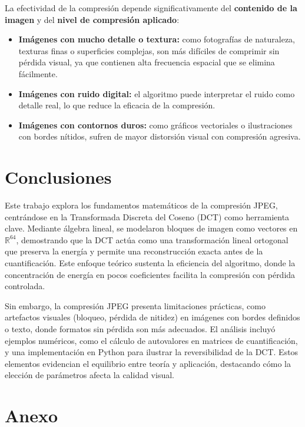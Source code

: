 \documentclass[8pt,a4paper]{article}
\theoremstyle{definition}
\theoremstyle{remark}
\begin{document}
\begin{multicols}{2}
        La efectividad de la compresión depende significativamente del \textbf{contenido de la imagen} y del \textbf{nivel de compresión aplicado}:
            
        \begin{itemize}
        \item \textbf{Imágenes con mucho detalle o textura:} como fotografías de naturaleza, texturas finas o superficies complejas, son más difíciles de comprimir sin pérdida visual, ya que contienen alta frecuencia espacial que se elimina fácilmente.
                
        \item \textbf{Imágenes con ruido digital:} el algoritmo puede interpretar el ruido como detalle real, lo que reduce la eficacia de la compresión.
                
        \item \textbf{Imágenes con contornos duros:} como gráficos vectoriales o ilustraciones con bordes nítidos, sufren de mayor distorsión visual con compresión agresiva.
        \end{itemize}

    \section{Conclusiones}
    Este trabajo explora los fundamentos matemáticos de la compresión JPEG, centrándose en la Transformada Discreta del Coseno (DCT) como herramienta clave. Mediante álgebra lineal, se modelaron bloques de imagen como vectores en \(\mathbb{R}^{64}\), demostrando que la DCT actúa como una transformación lineal ortogonal que preserva la energía y permite una reconstrucción exacta antes de la cuantificación. Este enfoque teórico sustenta la eficiencia del algoritmo, donde la concentración de energía en pocos coeficientes facilita la compresión con pérdida controlada. 
    
    Sin embargo, la compresión JPEG presenta limitaciones prácticas, como artefactos visuales (bloqueo, pérdida de nitidez) en imágenes con bordes definidos o texto, donde formatos sin pérdida son más adecuados. El análisis incluyó ejemplos numéricos, como el cálculo de autovalores en matrices de cuantificación, y una implementación en Python para ilustrar la reversibilidad de la DCT. Estos elementos evidencian el equilibrio entre teoría y aplicación, destacando cómo la elección de parámetros afecta la calidad visual.

\section*{Anexo}


\end{multicols}
\end{document}
